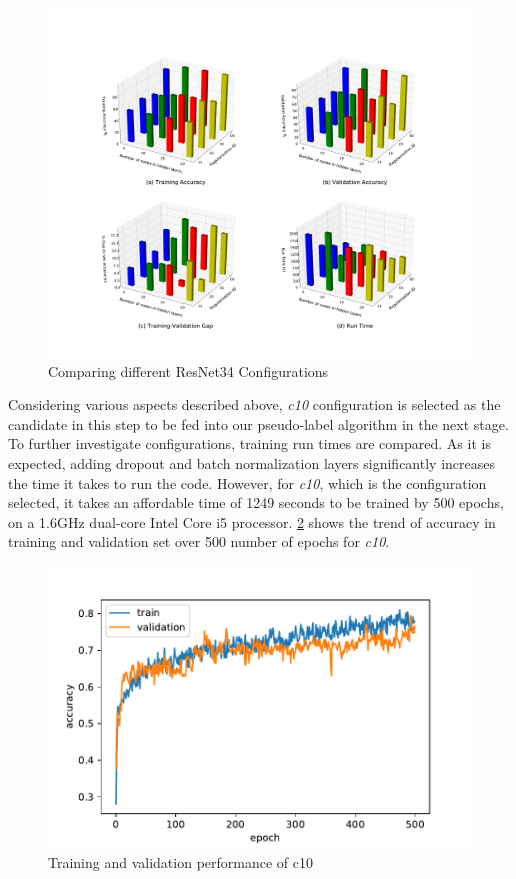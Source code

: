 \begin{figure}
    \centering
    \includegraphics[scale=0.15]{chapter_2/figures/conf.pdf}
    \caption{Comparing different ResNet34 Configurations }
    \label{fig:acc}
\end{figure}
Considering various aspects described above, \emph{c10} configuration is selected as the candidate in this step to be fed into our pseudo-label algorithm in the next stage.
To further investigate configurations, training run times are compared. As it is expected, adding dropout and batch normalization layers significantly increases the time it takes to run the code. However, for \emph{c10}, which is the configuration selected, it takes an affordable time of 1249 seconds to be trained by 500 epochs, on a 1.6GHz dual-core Intel Core i5 processor. \cref{fig:epoch} shows the trend of accuracy in training and validation set over 500 number of epochs for \emph{c10}.
\begin{figure}[t]
    \centering
    \includegraphics[scale=0.55]{chapter_2/figures/c10.pdf}
    \caption{Training and validation performance of c10}
    \label{fig:epoch}
\end{figure}

